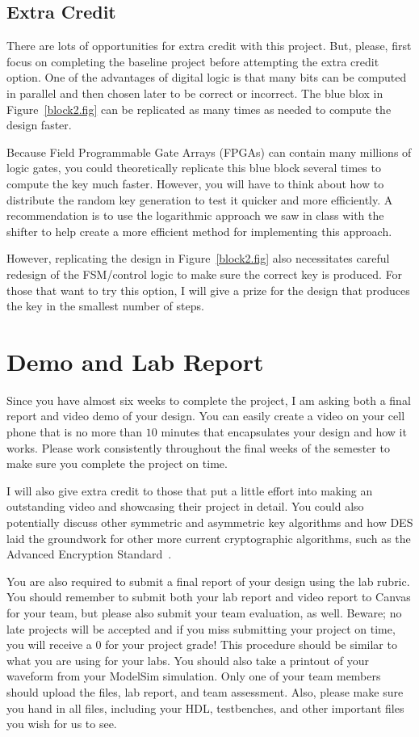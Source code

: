 \documentclass{article}
\begin{document}
\subsection{Extra Credit}

There are lots of opportunities for extra credit with this project.
But, please, first focus on completing the baseline project before
attempting the extra credit option.  One of the advantages of digital
logic is that many bits can be computed in parallel and then chosen
later to be correct or incorrect.  The blue blox in
Figure~\ref{block2.fig} can be replicated as many times as needed to
compute the design faster.

Because Field Programmable Gate Arrays
(FPGAs) can contain many millions of logic gates, you could
theoretically replicate this blue block several times to compute the key much
faster.  However, you will have to think about how to distribute the
random key generation to test it quicker and more efficiently.  A
recommendation is to use the logarithmic approach we saw in class
with the shifter to help create a more efficient method for
implementing this approach.

However, replicating the design in Figure~\ref{block2.fig} also
necessitates careful redesign of the FSM/control logic to make sure
the correct key is produced.  For those that want to try this option,
I will give a prize for the design that produces the key in the
smallest number of steps.

\section{Demo and Lab Report}

Since you have almost six weeks to complete the project, I am asking
both a final report and video demo of your design.  You can easily
create a video on your cell phone that is no more than $10$ minutes
that encapsulates your design and how it works.  Please work
consistently throughout the final weeks of the semester to make sure
you complete the project on time.

I will also give extra credit to those that put a little effort into
making an outstanding video and showcasing their project in detail.
You could also potentially discuss other symmetric and asymmetric
key algorithms and how DES laid the groundwork for other more
current cryptographic algorithms, such as the Advanced Encryption
Standard~\cite{10.5555/1721909}.

You are also required to submit a final report of your design using
the lab rubric.  You should remember to submit both your lab report
and video report to Canvas for
your team, but please also submit your team evaluation, as well.
Beware; no
late projects will be accepted and if you miss submitting your project
on time, you will receive a $0$ for your project grade!  This
procedure should be similar to what you are using for your labs.
You should also take a printout of your waveform 
from your ModelSim simulation.  
Only one of your team members should upload
the files, lab report, and team assessment.  Also, please make sure you
hand in all files, including your HDL, testbenches, and other
important files you wish for us to see.
\end{document}
